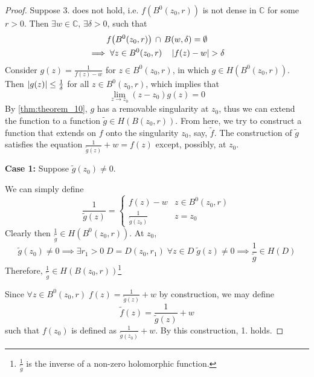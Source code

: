 \documentclass[11pt, oneside]{book}
\begin{document}
\begin{proof}
	Suppose 3. does not hold, i.e. $f(B^0(z_0, r))$ is not dense in $\mathbb{C}$ for some $r > 0$. Then $\exists w \in \mathbb{C}, \, \exists \delta > 0$, such that
	\begin{gather*}
		f\big( B^0(z_0, r) \big) \, \cap \, B(w, \delta) = \emptyset \\
		\implies \forall z \in B^0(z_0, r) \quad \left|f(z) - w\right| > \delta
	\end{gather*}
	Consider $g(z) = \frac{1}{f(z) - w}$ for $z \in B^0(z_0, r)$, in which $g \in H(B^0(z_0, r))$. Then $\left|g(z)\right| \leq \frac{1}{\delta}$ for all $z \in B^0(z_0, r)$, which implies that
	\begin{equation*}
		\lim_{z \to z_0} (z - z_0) g(z) = 0
	\end{equation*}
	By \cref{thm:theorem_10}, $g$ has a removable singularity at $z_0$, thus we can extend the function to a function $\tilde{g} \in H(B(z_0, r))$. From here, we try to construct a function that extends on $f$ onto the singularity $z_0$, say, $\tilde{f}$. The construction of $\tilde{g}$ satisfies the equation $\frac{1}{\tilde{g}(z)} + w = f(z)$ except, possibly, at $z_0$.

	\textbf{Case 1:} Suppose $\tilde{g}(z_0) \neq 0$.

	We can simply define
	\begin{equation*}
		\frac{1}{\tilde{g}(z)} = \begin{cases}
			f(z) - w 	& z \in B^0(z_0, r) \\
			\frac{1}{\tilde{g}(z_0)} & z = z_0
		\end{cases}
	\end{equation*}
	Clearly then $\frac{1}{\tilde{g}} \in H(B^0(z_0, r))$. At $z_0$,
	\begin{equation*}
		\tilde{g}(z_0) \neq 0 \implies \exists r_1 > 0 \; D = D(z_0, r_1) \; \forall z \in D \; \tilde{g}(z) \neq 0 \implies \frac{1}{\tilde{g}} \in H(D)
	\end{equation*}
	Therefore, $\frac{1}{\tilde{g}} \in H(B(z_0, r))$\footnote{$\frac{1}{\tilde{g}}$ is the inverse of a non-zero holomorphic function.}

	Since $\forall z \in B^0(z_0, r) \; f(z) = \frac{1}{\tilde{g}(z)} + w$ by construction, we may define
	\begin{equation*}
		\tilde{f}(z) = \frac{1}{\tilde{g}(z)} + w
	\end{equation*}
	such that $f(z_0)$ is defined as $\frac{1}{\tilde{g}(z_0)} + w$. By this construction, 1. holds.


\end{proof}
\end{document}
